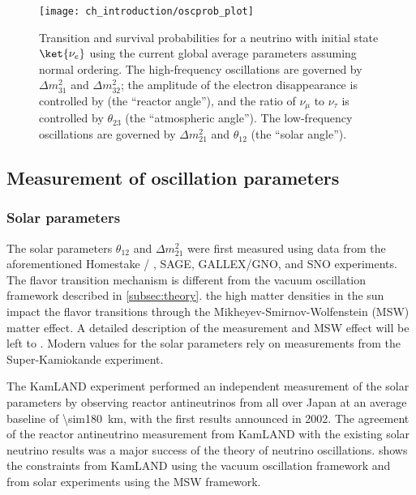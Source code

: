 \begin{figure}
    \centering
    \texttt{[image: ch\_introduction/oscprob\_plot]}
    \caption{
        Transition and survival probabilities for a neutrino
        with initial state $\ket{\nu_e}$
        using the current global average parameters
        assuming normal ordering.
        The high-frequency oscillations are governed by
        $\Delta m^2_{31}$ and $\Delta m^2_{32}$;
        the amplitude of the electron disappearance
        is controlled by \thetaot{} (the ``reactor angle''),
        and the ratio of $\nu_\mu$ to $\nu_\tau$
        is controlled by $\theta_{23}$ (the ``atmospheric angle'').
        The low-frequency oscillations are governed by
        $\Delta m^2_{21}$ and $\theta_{12}$ (the ``solar angle'').
    }
    \label{fig:oscprob}
\end{figure}

\subsection{Measurement of oscillation parameters}
\label{subsec:osc_param_exp}

\subsubsection{Solar parameters}
The solar parameters $\theta_{12}$ and $\Delta m^2_{21}$
were first measured using data from the aforementioned
Homestake / , SAGE, GALLEX/GNO, and SNO experiments.
The flavor transition mechanism is different from
the vacuum oscillation framework described in \cref{subsec:theory}.
the high matter densities in the sun impact the flavor transitions
through the Mikheyev-Smirnov-Wolfenstein (MSW) matter effect.
A detailed description of the measurement and MSW effect
will be left to \cite{neutrino_textbook}.
Modern values for the solar parameters rely
on measurements from the Super-Kamiokande experiment.

The KamLAND experiment performed
an independent measurement of the solar parameters
by observing reactor antineutrinos from all over Japan
at an average baseline of \SI{\sim180}{\km},
with the first results announced in 2002.
The agreement of the reactor antineutrino measurement from KamLAND
with the existing solar neutrino results
was a major success of the theory of neutrino oscillations.
 shows the constraints
from KamLAND using the vacuum oscillation framework
and from solar experiments using the MSW framework.

